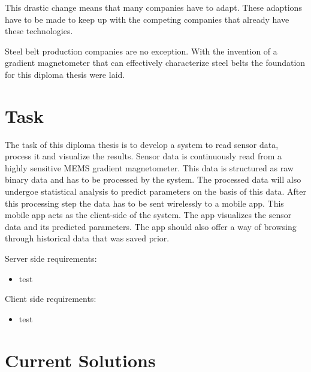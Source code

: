 This drastic change means that many companies have to adapt. These adaptions have to be made to keep up with the competing companies that already have these technologies.

Steel belt production companies are no exception. With the invention of a gradient magnetometer that can effectively characterize steel belts the foundation for this diploma thesis were laid.


\section{Task}

The task of this diploma thesis is to develop a system to read sensor data, process it and visualize the results. Sensor data is continuously read from a highly sensitive MEMS gradient magnetometer. This data is structured as raw binary data and has to be processed by the system. The processed data will also undergoe statistical analysis to predict parameters on the basis of this data. After this processing step the data has to be sent wirelessly to a mobile app. This mobile app acts as the client-side of the system. The app visualizes the sensor data and its predicted parameters. The app should also offer a way of browsing through historical data that was saved prior.


Server side requirements:

\begin{itemize}
    \item test
\end{itemize}


Client side requirements:

\begin{itemize}
    \item test
\end{itemize}

\section{Current Solutions}



